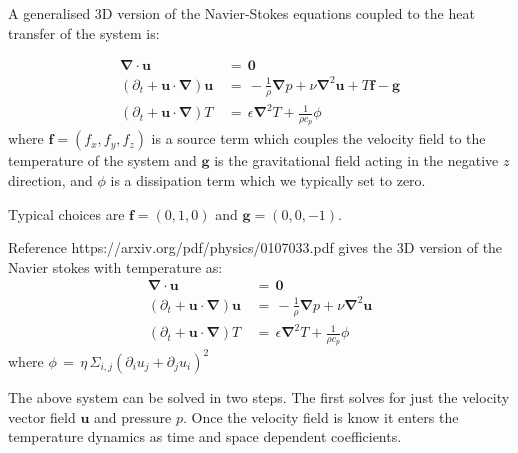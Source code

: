 \documentclass[11pt,a4paper]{report}
\begin{document}
A generalised 3D version of the Navier-Stokes equations coupled to the heat transfer of the system is:

\begin{subequations}
\label{eq:NS_TP_3D}
\begin{align}
\boldsymbol{\nabla}\cdot\boldsymbol{u}\,&=\,\boldsymbol{0}  \label{eq:NS_TP_3D_1}\\
\left(\partial_{t}+\boldsymbol{u}\cdot\boldsymbol{\nabla}\right)\boldsymbol{u}\,&=\,-\frac{1}{\rho}\boldsymbol{\nabla}p+\nu\boldsymbol{\nabla}^{2}\boldsymbol{u}+T\boldsymbol{f}-\boldsymbol{g} \label{eq:NS_TP_3D_2}\\
\left(\partial_{t}+\boldsymbol{u}\cdot\boldsymbol{\nabla}\right)T\,&=\,\epsilon \boldsymbol{\nabla}^{2}T+\frac{1}{\rho c_{p}}\phi \label{eq:NS_TP_3D_3}
\end{align}
\end{subequations}
where $\boldsymbol{f}=(f_{x},f_{y},f_{z})$ is a source term which couples the velocity field to the temperature of the system and $\boldsymbol{g}$ is the gravitational field acting in the negative $z$ direction, and $\phi$ is a dissipation term which we typically set to zero.

Typical choices are $\boldsymbol{f}=(0,1,0)$ and $\boldsymbol{g}=(0,0,-1)$. 

Reference {https://arxiv.org/pdf/physics/0107033.pdf} gives the 3D version of the Navier stokes with temperature as:
\begin{subequations}
\label{eq:NS_TP_3D_002}
\begin{align}
\boldsymbol{\nabla}\cdot\boldsymbol{u}\,&=\,\boldsymbol{0}  \label{eq:NS_TP_3D_002_1}\\
\left(\partial_{t}+\boldsymbol{u}\cdot\boldsymbol{\nabla}\right)\boldsymbol{u}\,&=\,-\frac{1}{\rho}\boldsymbol{\nabla}p+\nu\boldsymbol{\nabla}^{2}\boldsymbol{u} \label{eq:NS_TP_3D_002_2}\\
\left(\partial_{t}+\boldsymbol{u}\cdot\boldsymbol{\nabla}\right)T\,&=\,\epsilon \boldsymbol{\nabla}^{2}T+\frac{1}{\rho c_{p}}\phi \label{eq:NS_TP_3D_002_3}
\end{align}
\end{subequations}
where $\phi\,=\,\eta\,\Sigma_{i,j}\left(\partial_{i}u_{j}+\partial_{j}u_{i}\right)^{2}$

The above system can be solved in two steps. The first solves for just the velocity vector field $\boldsymbol{u}$ and pressure $p$. Once the velocity field is know it enters the temperature dynamics as time and space dependent coefficients. 
\end{document}

